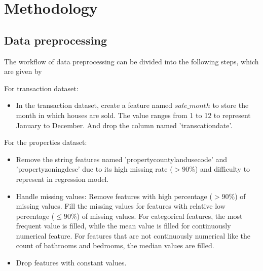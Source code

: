 \documentclass[12pt]{article}
\begin{document}
\section{Methodology}\label{sec:methodology}
\subsection{Data preprocessing}
The workflow of data preprocessing can be divided into the following steps, which are given by 

For transaction dataset:
\begin{itemize}
	\item In the transaction dataset, create a feature named $sale\_month$ to store the month in which houses are sold. The value ranges from 1 to 12 to represent January to December. And drop the column named 'transcationdate'. 
\end{itemize}

For the properties dataset:

\begin{itemize}
	\item Remove the string features named 'propertycountylandusecode' and 'propertyzoningdesc' due to its high missing rate ($>90\%$) and difficulty to represent in regression model.
\end{itemize}

\begin{itemize}
	\item Handle missing values: Remove features with high percentage ($>90\%$) of missing values. Fill the missing values for features with relative low percentage ($\leq90\%$) of missing values. For categorical features, the most frequent value is filled, while the mean value is filled for continuously numerical feature. For features that are not continuously numerical like the count of bathrooms and bedrooms, the median values are filled.
\end{itemize}

\begin{itemize}
	\item Drop features with constant values.
\end{itemize}

\end{document}
